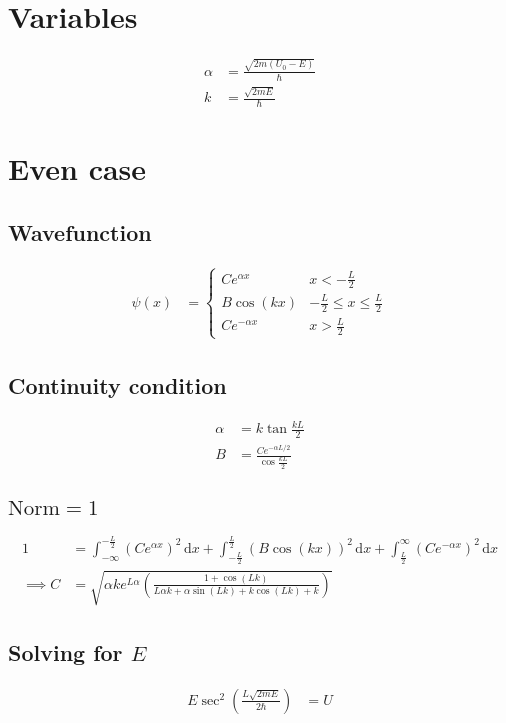 \documentclass{article}
\newcommand{\dx}{\,\mathrm{d}x}
\begin{document}
\section{Variables}
\begin{align*}
	\alpha & =\frac{\sqrt{2m(U_0-E)}}{\hbar} \\
	k      & =\frac{\sqrt{2mE}}{\hbar}
\end{align*}
\section{Even case}
\subsection{Wavefunction}
\begin{align}
	\psi(x) & =\begin{cases}
		Ce^{\alpha x}  & x<-\frac{L}{2}                    \\
		B\cos(k x)     & -\frac{L}{2}\le x \le \frac{L}{2} \\
		Ce^{-\alpha x} & x>\frac{L}{2}
	\end{cases}
\end{align}
\subsection{Continuity condition}
\begin{align}
	\alpha & =k\tan\frac{kL}{2}                         \\
	B      & =\frac{Ce^{-\alpha L/2}}{\cos\frac{kL}{2}}
\end{align}
\subsection{\(\textrm{Norm} = 1\)}
\begin{align}
	1          & =
	\int_{-\infty}^{-\frac{L}{2}}{(Ce^{\alpha x} )}^2\dx+\int_{-\frac{L}{2}}^{\frac{L}{2}}{(B\cos(k x) )}^2\dx+\int_{\frac{L}{2}}^{\infty}{(Ce^{-\alpha x})}^2\dx         \\
	\implies C & =  \sqrt{\alpha k e^{L\alpha}\left(\frac{1+\cos{\left(L k \right)}}{L \alpha k + \alpha \sin{\left(L k \right)} + k \cos{\left(L k \right)} + k}\right)}
\end{align}
\subsection{Solving for \(E\)}
\begin{align}
	E\sec^2\left(\frac{L\sqrt{2mE}}{2\hbar}\right) & = U
\end{align}
\end{document}
